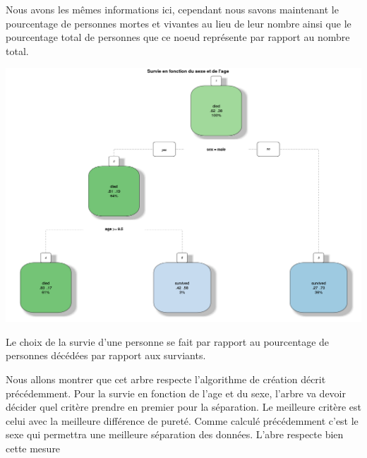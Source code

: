 \documentclass[compress]{beamer}
\begin{document}
\begin{frame}
Nous avons les mêmes informations ici, cependant nous savons maintenant le pourcentage de personnes mortes et vivantes au lieu de leur nombre ainsi que le pourcentage
total de personnes que ce noeud représente par rapport au nombre total.
       \begin{center}
            \includegraphics[width=\textwidth,height=0.8\textheight,keepaspectratio]{survie-sexe-age.png}
        \end{center}
\end{frame}


\begin{frame}
Le choix de la survie d'une personne se fait par rapport au pourcentage de personnes décédées par rapport aux surviants. 

 Nous allons montrer que cet arbre respecte l'algorithme de création décrit précédemment. Pour la survie en fonction de l'age et du sexe, l'arbre va devoir décider quel
 critère prendre en premier pour la séparation. Le meilleure critère est celui avec la meilleure différence de pureté. Comme calculé précédemment c'est
 le sexe qui permettra une meilleure séparation des données. L'abre respecte bien cette mesure

\end{frame}
\end{document}
